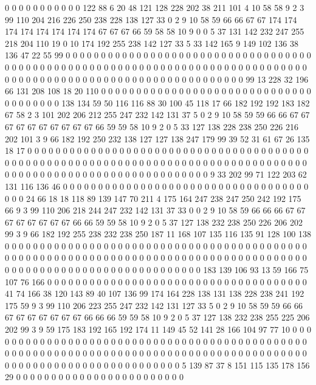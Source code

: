 0 0 0 0 0 0 0 0 0 0 0 122 88 6 20 48 121 128 228 202
38 211 101 4 10 58 58 9 2 3 99 110 204 216 226 250 238 228 138 127
33 0 2 9 10 58 59 66 66 67 67 174 174 174 174 174 174 174 174 67
67 67 66 59 58 58 10 9 0 0 5 37 131 142 232 247 255 218 204 110
19 0 10 174 192 255 238 142 127 33 5 33 142 165 9 149 102 136 38 136
47 22 55 99 0 0 0 0 0 0 0 0 0 0 0 0 0 0 0 0
0 0 0 0 0 0 0 0 0 0 0 0 0 0 0 0 0 0 0 0
0 0 0 0 0 0 0 0 0 0 0 0 0 0 0 0 0 0 0 0
0 0 0 0 0 0 0 0 0 0 0 0 0 0 0 0 0 0 0 0
0 0 0 0 0 0 0 0 0 0 0 0 0 0 0 0 0 0 0 0
0 0 0 0 0 0 0 0 0 0 0 0 0 0 0 0 99 13 228 32
196 66 131 208 108 18 20 110 0 0 0 0 0 0 0 0 0 0 0 0
0 0 0 0 0 0 0 0 0 0 0 0 0 0 0 0 0 0 0 0
0 0 0 0 0 0 138 134 59 50 116 116 88 30 100 45 118 17 66 182
192 192 183 182 67 58 2 3 101 202 206 212 255 247 232 142 131 37 5 0
2 9 10 58 59 59 66 66 67 67 67 67 67 67 67 67 67 67 66 59
59 58 10 9 2 0 5 33 127 138 228 238 250 226 216 202 101 3 9 66
182 192 250 232 138 127 127 138 247 179 99 39 52 31 61 67 26 135 18 17
0 0 0 0 0 0 0 0 0 0 0 0 0 0 0 0 0 0 0 0
0 0 0 0 0 0 0 0 0 0 0 0 0 0 0 0 0 0 0 0
0 0 0 0 0 0 0 0 0 0 0 0 0 0 0 0 0 0 0 0
0 0 0 0 0 0 0 0 0 0 0 0 0 0 0 0 0 0 0 0
0 0 0 0 0 0 0 0 0 0 0 0 0 0 0 0 0 0 0 0
0 0 0 0 0 0 0 0 0 0 0 0 9 33 202 99 71 122 203 62
131 116 136 46 0 0 0 0 0 0 0 0 0 0 0 0 0 0 0 0
0 0 0 0 0 0 0 0 0 0 0 0 0 0 0 0 0 0 0 0
0 0 24 66 18 18 118 89 139 147 70 211 4 175 164 247 238 247 250 242
192 175 66 9 3 99 110 206 218 244 247 232 142 131 37 33 0 0 2 9
10 58 59 66 66 66 67 67 67 67 67 67 67 67 66 66 59 59 58 10
9 2 0 5 37 127 138 232 238 250 226 206 202 99 3 9 66 182 192 255
238 232 238 250 187 11 168 107 135 116 135 91 128 100 138 0 0 0 0 0
0 0 0 0 0 0 0 0 0 0 0 0 0 0 0 0 0 0 0 0
0 0 0 0 0 0 0 0 0 0 0 0 0 0 0 0 0 0 0 0
0 0 0 0 0 0 0 0 0 0 0 0 0 0 0 0 0 0 0 0
0 0 0 0 0 0 0 0 0 0 0 0 0 0 0 0 0 0 0 0
0 0 0 0 0 0 0 0 0 0 0 0 0 0 0 0 0 0 0 0
0 0 0 0 0 0 0 0 0 183 139 106 93 13 59 166 75 107 76 166
0 0 0 0 0 0 0 0 0 0 0 0 0 0 0 0 0 0 0 0
0 0 0 0 0 0 0 0 0 0 0 0 0 0 0 0 0 41 74 166
38 120 143 89 40 107 136 99 174 164 228 138 131 138 228 238 241 192 175 59
9 3 99 110 206 223 255 247 232 142 131 127 33 5 0 2 9 10 58 59
59 66 66 67 67 67 67 67 67 67 66 66 66 59 59 58 10 9 2 0
5 37 127 138 232 238 255 225 206 202 99 3 9 59 175 183 192 165 192 174
11 149 45 52 141 28 166 104 97 77 10 0 0 0 0 0 0 0 0 0
0 0 0 0 0 0 0 0 0 0 0 0 0 0 0 0 0 0 0 0
0 0 0 0 0 0 0 0 0 0 0 0 0 0 0 0 0 0 0 0
0 0 0 0 0 0 0 0 0 0 0 0 0 0 0 0 0 0 0 0
0 0 0 0 0 0 0 0 0 0 0 0 0 0 0 0 0 0 0 0
0 0 0 0 0 0 0 0 0 0 0 0 0 0 0 0 0 0 0 0
0 0 0 0 0 5 139 87 37 8 151 115 135 178 156 29 0 0 0 0
0 0 0 0 0 0 0 0 0 0 0 0 0 0 0 0 0 0 0 0

